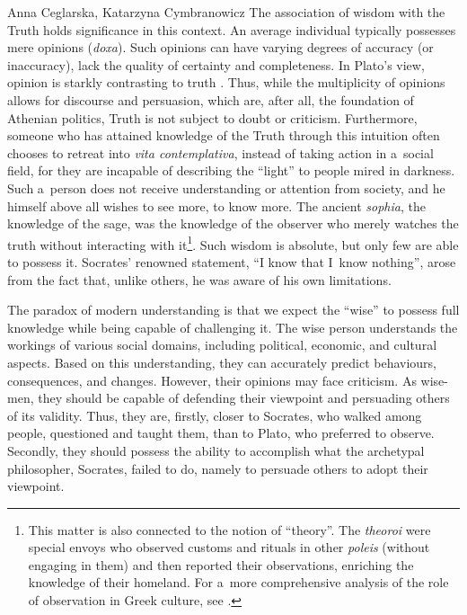 \begin{artengenv2auth}{Anna Ceglarska, Katarzyna Cymbranowicz}
The association of wisdom with the Truth holds significance in this context. An average individual typically possesses mere opinions (\textit{doxa}). Such opinions can have varying degrees of accuracy (or inaccuracy), lack the quality of certainty and completeness. In Plato's view, opinion is starkly contrasting to truth 
\parencite[][pp.7–8]{arendt_promise_2005}. %
 Thus, while the multiplicity of opinions allows for discourse and persuasion, which are, after all, the foundation of Athenian politics, Truth is not subject to doubt or criticism. Furthermore, someone who has attained knowledge of the Truth through this intuition often chooses to retreat into \textit{vita contemplativa}, instead of taking action in a~social field, for they are incapable of describing the ``light'' to people mired in darkness. Such a~person does not receive understanding or attention from society, and he himself above all wishes to see more, to know more. The ancient \textit{sophia}, the knowledge of the sage, was the knowledge of the observer who merely watches the truth without interacting with it\footnote{This matter is also connected to the notion of ``theory''. The \textit{theoroi} were special envoys who observed customs and rituals in other \textit{poleis} (without engaging in them) and then reported their observations, enriching the knowledge of their homeland. For a~more comprehensive analysis of the role of observation in Greek culture, see 
\parencite[][]{ceglarska_od_2022}.%
}. Such wisdom is absolute, but only few are able to possess it. Socrates' renowned statement, ``I know that I~know nothing'', arose from the fact that, unlike others, he was aware of his own limitations.



The paradox of modern understanding is that we expect the ``wise'' to possess full knowledge while being capable of challenging it. The wise person understands the workings of various social domains, including political, economic, and cultural aspects. Based on this understanding, they can accurately predict behaviours, consequences, and changes. However, their opinions may face criticism. As wise-men, they should be capable of defending their viewpoint and persuading others of its validity. Thus, they are, firstly, closer to Socrates, who walked among people, questioned and taught them, than to Plato, who preferred to observe. Secondly, they should possess the ability to accomplish what the archetypal philosopher, Socrates, failed to do, namely to persuade others to adopt their viewpoint.




\end{artengenv2auth}
